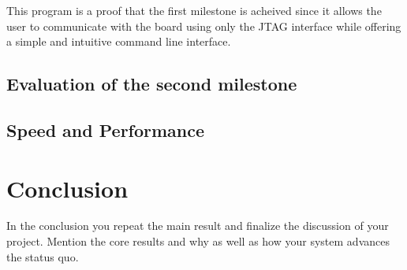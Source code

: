\documentclass[a4paper,11pt,oneside]{report}
\begin{document}
This program is a proof that the first milestone is acheived since it allows the user to communicate with the board using only the JTAG interface while offering a simple and intuitive command line interface.

\section{Evaluation of the second milestone}


\section{Speed and Performance}



\chapter{Conclusion}

In the conclusion you repeat the main result and finalize the discussion of
your project. Mention the core results and why as well as how your system
advances the status quo.

\cleardoublepage
{}
{}
\printbibliography

%
%
\end{document}
